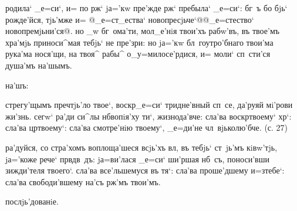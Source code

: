
родила` _е=си`, и= по рж` jа='кw пре'жде рж` 
пребыла` _е=си`: бг~ъ бо бjь` рожде'йся, тjь'мже и= 
@_е=ст_ества` новопресjьче`@{@_е=стество` 
новопремjьни'ся@}. но _w бг~ома'ти, мол_е'нiя твои'хъ 
рабw'въ, въ твое'мъ хра'мjь приноси^мая тебjь` не 
пре'зри: но jа='кw бл~гоутро'бнаго твои'ма рука'ма 
нося'щи, на твоя^ рабы^ о_у=милосе'рдися, и= моли` 
сп~сти'ся душа'мъ на'шымъ.

на'шъ:


стрегу'щымъ преч тjь'ло твое`, воскр _е=си` 
тридне'вный сп~се, да'руяй мi'рови жи'знь. сегw` ра'ди 
си^лы нб вопiя'ху ти`, жизнода'вче: сла'ва 
воскр твоему` хр`: сла'ва цр твоему`: 
сла'ва смотре'нiю твоему`, _е=ди'не чл~вjьколю'бче. (с. 
27)

ра'дуйся, со стра'хомъ воплоща'шеся всjь'хъ вл, въ 
тебjь` ст~jь'мъ кiвw'тjь, jа='коже рече` прв дв~дъ: 
jа=ви'лася _е=си` ши'ршая нб~съ, поноси'вши зижди'теля 
твоего`. сла'ва все'льшемуся въ тя`: сла'ва проше'дшему 
и=з\ъ тебе`: сла'ва свободи'вшему на'съ рж'мъ 
твои'мъ.

послjь'дованiе.%
